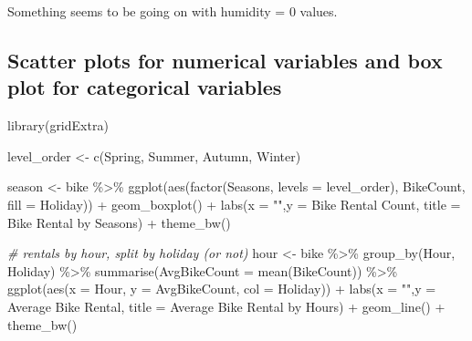 \documentclass[
]{article}
\newenvironment{Shaded}{\begin{snugshade}}{\end{snugshade}}
\newcommand{\AttributeTok}[1]{\textcolor[rgb]{0.77,0.63,0.00}{#1}}
\newcommand{\CommentTok}[1]{\textcolor[rgb]{0.56,0.35,0.01}{\textit{#1}}}
\newcommand{\FunctionTok}[1]{\textcolor[rgb]{0.00,0.00,0.00}{#1}}
\newcommand{\NormalTok}[1]{#1}
\newcommand{\OtherTok}[1]{\textcolor[rgb]{0.56,0.35,0.01}{#1}}
\newcommand{\SpecialCharTok}[1]{\textcolor[rgb]{0.00,0.00,0.00}{#1}}
\newcommand{\StringTok}[1]{\textcolor[rgb]{0.31,0.60,0.02}{#1}}
\begin{document}
Something seems to be going on with humidity = 0 values.

\newpage

\hypertarget{scatter-plots-for-numerical-variables-and-box-plot-for-categorical-variables}{%
\subsection{Scatter plots for numerical variables and box plot for
categorical
variables}\label{scatter-plots-for-numerical-variables-and-box-plot-for-categorical-variables}}

\begin{Shaded}
\begin{Highlighting}[]
\FunctionTok{library}\NormalTok{(gridExtra)}

\NormalTok{level\_order }\OtherTok{\textless{}{-}} \FunctionTok{c}\NormalTok{(}\StringTok{\textquotesingle{}Spring\textquotesingle{}}\NormalTok{, }\StringTok{\textquotesingle{}Summer\textquotesingle{}}\NormalTok{, }\StringTok{\textquotesingle{}Autumn\textquotesingle{}}\NormalTok{, }\StringTok{\textquotesingle{}Winter\textquotesingle{}}\NormalTok{)}

\NormalTok{season }\OtherTok{\textless{}{-}}\NormalTok{ bike }\SpecialCharTok{\%\textgreater{}\%} 
  \FunctionTok{ggplot}\NormalTok{(}\FunctionTok{aes}\NormalTok{(}\FunctionTok{factor}\NormalTok{(Seasons, }\AttributeTok{levels =}\NormalTok{ level\_order), BikeCount, }\AttributeTok{fill =}\NormalTok{ Holiday)) }\SpecialCharTok{+}
  \FunctionTok{geom\_boxplot}\NormalTok{() }\SpecialCharTok{+} 
  \FunctionTok{labs}\NormalTok{(}\AttributeTok{x =} \StringTok{""}\NormalTok{,}\AttributeTok{y =} \StringTok{\textquotesingle{}Bike Rental Count\textquotesingle{}}\NormalTok{, }
       \AttributeTok{title =} \StringTok{\textquotesingle{}Bike Rental by Seasons\textquotesingle{}}\NormalTok{) }\SpecialCharTok{+}
  \FunctionTok{theme\_bw}\NormalTok{()}

\CommentTok{\# rentals by hour, split by holiday (or not)}
\NormalTok{hour }\OtherTok{\textless{}{-}}\NormalTok{ bike }\SpecialCharTok{\%\textgreater{}\%} \FunctionTok{group\_by}\NormalTok{(Hour, Holiday) }\SpecialCharTok{\%\textgreater{}\%}
  \FunctionTok{summarise}\NormalTok{(}\AttributeTok{AvgBikeCount =} \FunctionTok{mean}\NormalTok{(BikeCount)) }\SpecialCharTok{\%\textgreater{}\%}
  \FunctionTok{ggplot}\NormalTok{(}\FunctionTok{aes}\NormalTok{(}\AttributeTok{x =}\NormalTok{ Hour, }\AttributeTok{y =}\NormalTok{ AvgBikeCount, }\AttributeTok{col =}\NormalTok{ Holiday)) }\SpecialCharTok{+}
  \FunctionTok{labs}\NormalTok{(}\AttributeTok{x =} \StringTok{""}\NormalTok{,}\AttributeTok{y =} \StringTok{\textquotesingle{}Average Bike Rental\textquotesingle{}}\NormalTok{, }
       \AttributeTok{title =} \StringTok{\textquotesingle{}Average Bike Rental by Hours\textquotesingle{}}\NormalTok{) }\SpecialCharTok{+}
  \FunctionTok{geom\_line}\NormalTok{() }\SpecialCharTok{+} \FunctionTok{theme\_bw}\NormalTok{()}
\end{Highlighting}
\end{Shaded}
\end{document}
